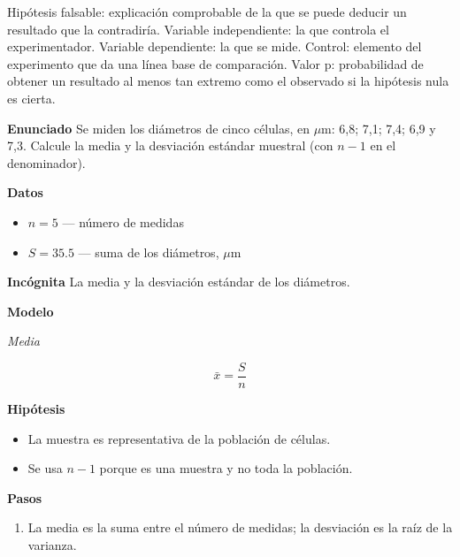 \documentclass{book}
\begin{document}
\begin{tcolorbox}[title={Definición}, studiumdef, breakable]

Hipótesis falsable: explicación comprobable de la que se puede deducir un resultado que la contradiría. Variable independiente: la que controla el experimentador. Variable dependiente: la que se mide. Control: elemento del experimento que da una línea base de comparación. Valor p: probabilidad de obtener un resultado al menos tan extremo como el observado si la hipótesis nula es cierta.

\end{tcolorbox}

\begin{tcolorbox}[title={Problema resuelto}, studiumworked, breakable]

\noindent\textbf{Enunciado}
Se miden los diámetros de cinco células, en \(\mu\mathrm{m}\): 6,8; 7,1; 7,4; 6,9 y 7,3. Calcule la media y la desviación estándar muestral (con \(n - 1\) en el denominador).


\noindent\textbf{Datos}
\begin{itemize}
\item $n = 5$ — número de medidas
\item $S = 35.5$ — suma de los diámetros, \(\mu\mathrm{m}\)
\end{itemize}

\noindent\textbf{Incógnita}
La media y la desviación estándar de los diámetros.


\noindent\textbf{Modelo}

\noindent\textit{Media}

\[
\bar{x} = \frac{S}{n}
\]

\noindent\textbf{Hipótesis}
\begin{itemize}
\item La muestra es representativa de la población de células.
\item Se usa \(n - 1\) porque es una muestra y no toda la población.
\end{itemize}

\noindent\textbf{Pasos}
\begin{enumerate}
\item
La media es la suma entre el número de medidas; la desviación es la raíz de la varianza.


\end{enumerate}
\end{tcolorbox}
\end{document}
